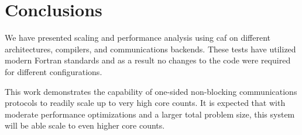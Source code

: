 \section{Conclusions}
We have presented scaling and performance analysis using \gls{caf} on different architectures, compilers, and communications backends.  
These tests have utilized modern Fortran standards and as a result no changes to the code were required for different configurations.  

This work demonstrates the capability of one-sided non-blocking communications protocols to readily scale up to very high core counts. 
It is expected that with moderate performance optimizations and a larger total problem size, this system will be able scale to even higher core counts.  







